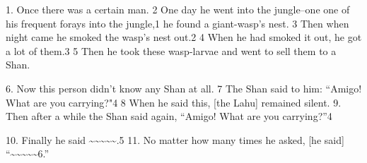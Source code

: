 \setcounter{footnote}{0}


1. Once there was a certain man. 2 One day he went into the jungle--one one of his
frequent forays into the jungle,1 he found a giant-wasp's nest. 3 Then when night
came he smoked the wasp's nest out.2 4 When he had smoked it out, he got a lot
of them.3 5 Then he took these wasp-larvae and went to sell them to a Shan.

6. Now this person didn't know any Shan at all. 7 The Shan said to him: ``Amigo!
What are you carrying?"4 8 When he said this, [the Lahu] remained silent.
9. Then after a while the Shan said again, ``Amigo! What are you carrying?''4

10. Finally he said \textasciitilde{}\textasciitilde{}\textasciitilde{}\textasciitilde{}\textasciitilde{}.5
11. No matter how many times he asked, [he said] ``\textasciitilde{}\textasciitilde{}\textasciitilde{}\textasciitilde{}\textasciitilde{}6.''

